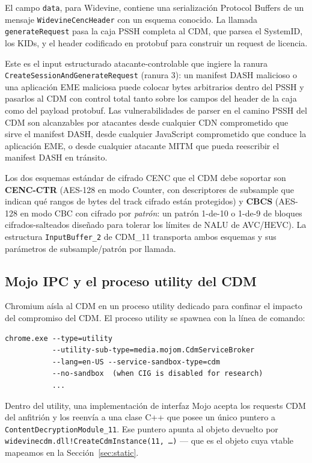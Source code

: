 \documentclass[11pt,letterpaper]{article}
\begin{document}
El campo \texttt{data}, para Widevine, contiene una serialización
Protocol Buffers de un mensaje \texttt{WidevineCencHeader} con un
esquema conocido. La llamada \texttt{generateRequest} pasa la caja
PSSH completa al CDM, que parsea el SystemID, los KIDs, y el
header codificado en protobuf para construir un request de
licencia.

Este es el input estructurado atacante-controlable que ingiere la
ranura \texttt{CreateSessionAndGenerateRequest} (ranura 3): un
manifest DASH malicioso o una aplicación EME maliciosa puede
colocar bytes arbitrarios dentro del PSSH y pasarlos al CDM con
control total tanto sobre los campos del header de la caja como
del payload protobuf. Las vulnerabilidades de parser en el camino
PSSH del CDM son alcanzables por atacantes desde cualquier CDN
comprometido que sirve el manifest DASH, desde cualquier JavaScript
comprometido que conduce la aplicación EME, o desde cualquier
atacante MITM que pueda reescribir el manifest DASH en tránsito.

Los dos esquemas estándar de cifrado CENC que el CDM debe soportar
son \textbf{CENC-CTR} (AES-128 en modo Counter, con descriptores
de subsample que indican qué rangos de bytes del track cifrado
están protegidos) y \textbf{CBCS} (AES-128 en modo CBC con
cifrado por \emph{patrón}: un patrón 1-de-10 o 1-de-9 de bloques
cifrados-salteados diseñado para tolerar los límites de NALU de
AVC/HEVC). La estructura \texttt{InputBuffer\_2} de CDM\_11
transporta ambos esquemas y sus parámetros de subsample/patrón
por llamada.

\subsection{Mojo IPC y el proceso utility del CDM}
\label{sec:bg-mojo}

Chromium aísla al CDM en un proceso utility dedicado para
confinar el impacto del compromiso del CDM. El proceso utility se
spawnea con la línea de comando:

\begin{lstlisting}[basicstyle=\ttfamily\tiny]
chrome.exe --type=utility
           --utility-sub-type=media.mojom.CdmServiceBroker
           --lang=en-US --service-sandbox-type=cdm
           --no-sandbox  (when CIG is disabled for research)
           ...
\end{lstlisting}

Dentro del utility, una implementación de interfaz Mojo acepta
los requests CDM del anfitrión y los reenvía a una clase C++ que
posee un único puntero a
\texttt{ContentDecryptionModule\_11}. Ese puntero apunta al objeto
devuelto por
\texttt{widevinecdm.dll!CreateCdmInstance(11, \ldots)} ---
que es el objeto cuya vtable mapeamos en la
Sección~\ref{sec:static}.
\end{document}
